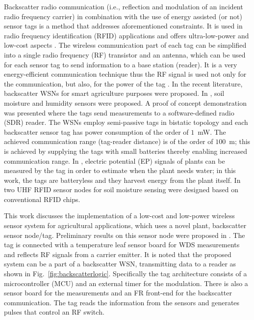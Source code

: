 \documentclass[journal]{IEEEtran}
\begin{document}
Backscatter radio communication (i.e., reflection and modulation of an incident radio frequency carrier) 
in combination with the use of energy assisted (or not) sensor tags is a method  that addresses aforementioned constraints.
%
It is used in radio frequency identification (RFID)
applications and offers ultra-low-power and low-cost aspects \cite{sample2008design}.  
%
The  wireless communication part of each tag can be 
simplified into a single radio frequency  (RF) transistor and an antenna, 
which can be used for each sensor tag to send information to a base station (reader).
%
It is a very energy-efficient communication technique
thus the RF signal is used not only for the communication, but also, for the power of the tag \cite{assimonis2015sensitive}.
%
In the recent literature,  backscatter WSNs  for smart agriculture purposes  \cite{daskalakis2016soil, kampianakis2014wireless, konstantopoulosconverting, pichorim2018two} were proposed. 
%
In \cite{daskalakis2016soil, kampianakis2014wireless},
soil moisture  and humidity  sensors were proposed.
%
A proof of concept demonstration was presented where the tags send measurements to a software-defined radio (SDR)
reader. 
%
The WSNs  employ semi-passive tags in bistatic topology and
each backscatter sensor tag has power consumption of the order of $1$~mW.
%
The achieved communication range  (tag-reader distance) is of the order of $100$~m; this is achieved by supplying the tags with small batteries thereby enabling increased communication range.
%
In \cite{konstantopoulosconverting},  electric potential (EP) signals of plants can be measured by the tag in order to estimate when the plant needs water; in this work, the tags are batteryless and they harvest energy from the plant itself.
%
In \cite{pichorim2018two}  two UHF RFID sensor nodes  for soil moisture sensing were designed based on conventional RFID chips.

This work discusses the implementation of a low-cost and low-power wireless sensor system for agricultural applications, which uses a novel plant, backscatter sensor node/tag.
%
Preliminary results on this sensor node were proposed in \cite{daskalakis2017backscatter}.
%
The tag is connected with a temperature leaf sensor board  for WDS measurements and reflects RF signals from a carrier emitter.
%
It is noted that the proposed system can be a part of a backscatter WSN, transmitting   data to a reader as shown in Fig.~\ref{fig:backscatterlogic}.
%
Specifically the tag architecture  consists of a microcontroller (MCU) and an external timer for the modulation.
%
There is also a sensor board for the   measurements and
an FR front-end for the backscatter communication.
%
The tag reads the information from the sensors and generates pulses that control an RF switch. 
%
\end{document}
